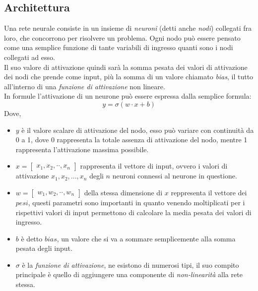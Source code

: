 \documentclass[12pt,a4paper,openright,twoside]{report}
\begin{document}
\subsection{Architettura }%
Una rete neurale consiste in un insieme di \emph{neuroni} (detti anche \emph{nodi}) collegati fra loro, che concorrono per risolvere un problema.
Ogni nodo può essere pensato come una semplice funzione di tante variabili di ingresso quanti sono i nodi collegati ad esso. \\
Il suo valore di attivazione quindi sarà la somma pesata dei valori di attivazione dei nodi che prende come input, più la somma di un valore chiamato \emph{bias}, il tutto all’interno di una \emph{funzione di attivazione} non lineare. \\
In formule l’attivazione di un neurone può essere espressa dalla semplice formula: \\
\begin{equation}
    y = \sigma(w \cdot x + b)
\end{equation}
Dove, \\
\begin{itemize}
    \item 
        $y$ è il valore scalare di attivazione del nodo, esso può variare con continuità da 0 a 1, dove 0 rappresenta la totale assenza di attivazione del nodo, mentre 1 rappresenta l'attivazione massima possibile. 
    \item 
        $ x= \begin{bmatrix} x_1 , x_2 , \cdot\cdot , x_n\end{bmatrix} $ rappresenta il vettore di input, ovvero i valori di attivazione $x_1, x_2, ... , x_n$ degli $n$ neuroni connessi al neurone in questione.
    \item 
        $ w= \begin{bmatrix} w_1 , w_2 , \cdot\cdot , w_n\end{bmatrix} $ della stessa dimensione di $x$
        reppresenta il vettore dei $pesi$, questi parametri sono importanti in quanto venendo moltiplicati per i rispettivi valori di input permettono di calcolare la media pesata dei valori di ingresso.
    \item 
        $b$ è detto $bias$, un valore che si va a sommare semplicemente alla somma pesata degli input.
    \item 
        $\sigma$ è la \emph{funzione di attivazione}, ne esistono di numerosi tipi, il suo compito principale è quello di aggiungere una componente di \emph{non-linearità} alla rete stessa. 

\end{itemize}
\end{document}
